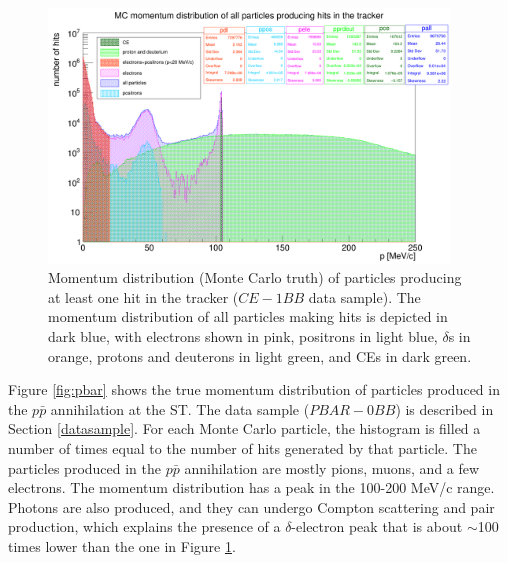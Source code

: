 \begin{figure}[!h]
        \centering
        \includegraphics[width =0.95\textwidth]{figures/png/Screenshot_20240812_152905.png}
    \caption[Monte Carlo momentum distribution 
    of particles producing hits in the Mu2e 
    tracker ($CE-1BB$ data sample).]{
        Momentum distribution (Monte Carlo truth)  
       of particles producing at 
       least one hit in the tracker 
       ($CE-1BB$ data sample).  
       The momentum distribution 
       of all particles making hits is 
       depicted in dark blue, with electrons 
       shown in pink, positrons in light 
       blue, $\delta$s in orange, protons 
       and deuterons in 
       light green, and CEs in dark green. }
       \label{fig:momhits}
\end{figure}


Figure \ref{fig:pbar} shows the true 
momentum distribution of 
particles produced in the $p\bar{p}$ 
annihilation at the ST. 
The data sample ($PBAR-0BB$) is described in Section \ref{datasample}.
For each Monte Carlo particle, the histogram 
is filled a number of times equal to the number 
of hits generated by that particle. 
The particles produced in the $p\bar{p}$ annihilation 
are mostly pions, muons, and a few electrons. 
The momentum distribution has a 
peak in the 100-200 MeV/c range. Photons are also 
produced, and they can undergo Compton scattering and 
pair production, which explains the presence of a 
$\delta$-electron peak that is about $\sim$100 
times lower than the one in Figure \ref{fig:momhits}.

